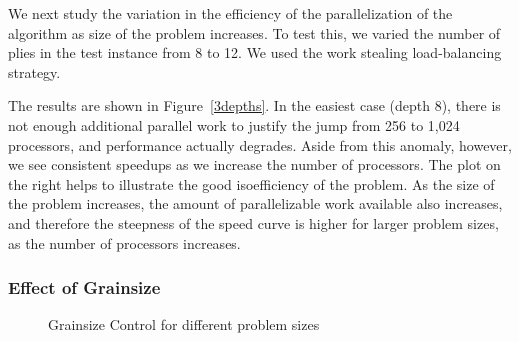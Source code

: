 \documentclass[times, 10pt,twocolumn]{article}
\begin{document}
We next study the variation in the efficiency of the parallelization of the
algorithm as size of the problem increases.  To test this, we varied the number
of plies in the test instance from 8 to 12. We used the work stealing
load-balancing strategy.  

The results are shown in Figure~\ref{3depths}.  In the easiest case (depth 8),
there is not enough additional parallel work to justify the jump from 256 to
1,024 processors, and performance actually degrades.  Aside from this anomaly,
however, we see consistent speedups as we increase the number of processors.
The plot on the right helps to illustrate the good isoefficiency of the
problem.  As the size of the problem increases, the amount of parallelizable
work available also increases, and therefore the steepness of the speed curve
is higher for larger problem sizes, as the number of processors increases.
 
\subsubsection{Effect of Grainsize}

\begin{figure}[!ht]
\centering
{} 
\vspace{-0.1in}
\caption{Grainsize Control for different problem sizes}
\label{fig:dep}
\vspace{-0.1in}
\end{figure}
\end{document}
